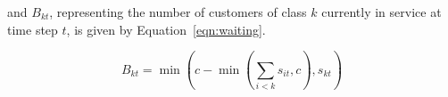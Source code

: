 \documentclass{article}
\begin{document}
and $B_{kt}$, representing the number of customers of class $k$ currently in service at
time step $t$, is given by Equation~\ref{eqn:waiting}.

\begin{equation}\label{eqn:waiting}
B_{kt} =\min\left(c - \min\left(\sum_{i < k} s_{it}, c\right), s_{kt}\right)
\end{equation}




\end{document}
